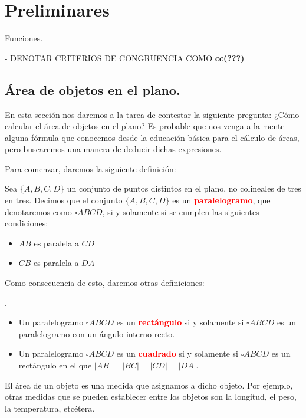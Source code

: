 \chapter{Preliminares}
Funciones.


- DENOTAR CRITERIOS DE CONGRUENCIA COMO \textbf{cc(???)}

\section{Área de objetos en el plano.}
En esta sección nos daremos a la tarea de contestar la siguiente pregunta: ¿Cómo calcular el área de objetos en el plano? Es probable que nos venga a la mente alguna fórmula que conocemos desde la educación básica para el cálculo de áreas, pero buscaremos una manera de deducir dichas expresiones.

Para comenzar, daremos la siguiente definición:

\begin{df}\label{paralelogramo}
Sea $\{A, B, C, D\}$ un conjunto de puntos distintos en el plano, no colineales de tres en tres. Decimos que  el conjunto $\{A, B, C, D\}$ es un \textcolor{red}{\bf paralelogramo}, que denotaremos como $\square ABCD$, si y solamente si se cumplen las siguientes condiciones:
\begin{itemize}
\item $\overline{AB}$ es paralela a $\overline{CD}$
\item $\overline{CB}$ es paralela a $\overline{DA}$
\end{itemize}
\end{df}

Como consecuencia de esto, daremos otras definiciones:

\begin{df}.
\begin{itemize}
\item Un paralelogramo $\square ABCD$ es un \textcolor{red}{\textbf{rectángulo}} si y solamente si $\square ABCD$ es un paralelogramo con un ángulo interno recto.
\item Un paralelogramo $\square ABCD$ es un \textcolor{red}{{\bf cuadrado}} si y solamente si $\square ABCD$ es un rectángulo en el que $|AB|=|BC|=|CD|=|DA|$.
\end{itemize}
\end{df}

El área de un objeto es una medida que asignamos a dicho objeto. Por ejemplo, otras medidas que se pueden establecer entre los objetos son la longitud, el peso, la temperatura, etcétera. \\

